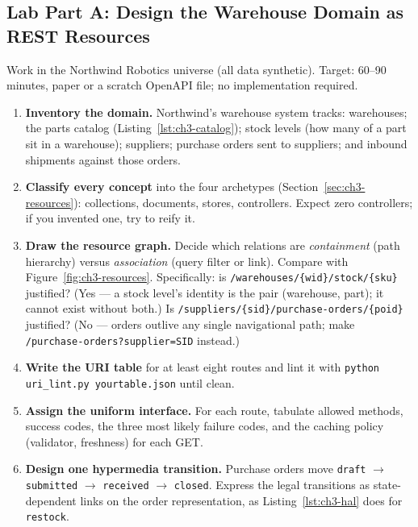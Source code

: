 \subsection{Lab Part A: Design the Warehouse Domain as REST Resources}

Work in the Northwind Robotics universe (all data synthetic). Target: 60--90
minutes, paper or a scratch OpenAPI file; no implementation required.

\begin{enumerate}
  \item \textbf{Inventory the domain.} Northwind's warehouse system tracks:
        warehouses; the parts catalog (Listing~\ref{lst:ch3-catalog}); stock
        levels (how many of a part sit in a warehouse); suppliers; purchase
        orders sent to suppliers; and inbound shipments against those orders.
  \item \textbf{Classify every concept} into the four archetypes
        (Section~\ref{sec:ch3-resources}): collections, documents, stores,
        controllers. Expect zero controllers; if you invented one, try to
        reify it.
  \item \textbf{Draw the resource graph.} Decide which relations are
        \emph{containment} (path hierarchy) versus \emph{association}
        (query filter or link). Compare with Figure~\ref{fig:ch3-resources}.
        Specifically: is \texttt{/warehouses/\{wid\}/stock/\{sku\}} justified?
        (Yes --- a stock level's identity is the pair (warehouse, part); it
        cannot exist without both.) Is \texttt{/suppliers/\{sid\}/purchase-orders/\{poid\}}
        justified? (No --- orders outlive any single navigational path; make
        \texttt{/purchase-orders?supplier=SID} instead.)
  \item \textbf{Write the URI table} for at least eight routes and lint it with
        \texttt{python uri\_lint.py yourtable.json} until clean.
  \item \textbf{Assign the uniform interface.} For each route, tabulate allowed
        methods, success codes, the three most likely failure codes, and the
        caching policy (validator, freshness) for each GET.
  \item \textbf{Design one hypermedia transition.} Purchase orders move
        \texttt{draft} $\rightarrow$ \texttt{submitted} $\rightarrow$
        \texttt{received} $\rightarrow$ \texttt{closed}. Express the legal
        transitions as state-dependent links on the order representation, as
        Listing~\ref{lst:ch3-hal} does for \texttt{restock}.
\end{enumerate}

